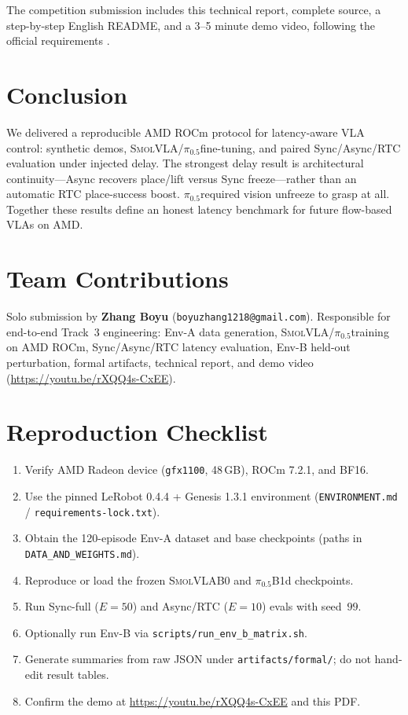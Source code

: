 \documentclass[10pt,twocolumn]{article}
\newcommand{\pifive}{$\pi_{0.5}$}
\newcommand{\smolvla}{\textsc{SmolVLA}}
\begin{document}
The competition submission includes this technical report, complete source,
a step-by-step English README, and a 3--5 minute demo video, following the
official requirements \cite{amd2026hackathon,amd2026submission}.

\section{Conclusion}

We delivered a reproducible AMD ROCm protocol for latency-aware VLA control:
synthetic demos, \smolvla/\pifive fine-tuning, and paired Sync/Async/RTC
evaluation under injected delay.  The strongest delay result is architectural
continuity---Async recovers place/lift versus Sync freeze---rather than an
automatic RTC place-success boost.  \pifive required vision unfreeze to grasp at
all.  Together these results define an honest latency benchmark for future
flow-based VLAs on AMD.

\section*{Team Contributions}

Solo submission by \textbf{Zhang Boyu}
(\texttt{boyuzhang1218@gmail.com}).
Responsible for end-to-end Track~3 engineering: Env-A data generation,
\smolvla/\pifive training on AMD ROCm, Sync/Async/RTC latency evaluation,
Env-B held-out perturbation, formal artifacts, technical report, and demo
video (\url{https://youtu.be/rXQQ4s-CxEE}).

\balance



\appendix
\onecolumn

\section{Reproduction Checklist}

\begin{enumerate}
  \item Verify AMD Radeon device (\texttt{gfx1100}, 48\,GB), ROCm 7.2.1, and BF16.
  \item Use the pinned LeRobot 0.4.4 + Genesis 1.3.1 environment
        (\texttt{ENVIRONMENT.md} / \texttt{requirements-lock.txt}).
  \item Obtain the 120-episode Env-A dataset and base checkpoints
        (paths in \texttt{DATA\_AND\_WEIGHTS.md}).
  \item Reproduce or load the frozen \smolvla B0 and \pifive B1d checkpoints.
  \item Run Sync-full ($E{=}50$) and Async/RTC ($E{=}10$) evals with seed~$99$.
  \item Optionally run Env-B via \texttt{scripts/run\_env\_b\_matrix.sh}.
  \item Generate summaries from raw JSON under \texttt{artifacts/formal/};
        do not hand-edit result tables.
  \item Confirm the demo at \url{https://youtu.be/rXQQ4s-CxEE} and this PDF.
\end{enumerate}
\end{document}
